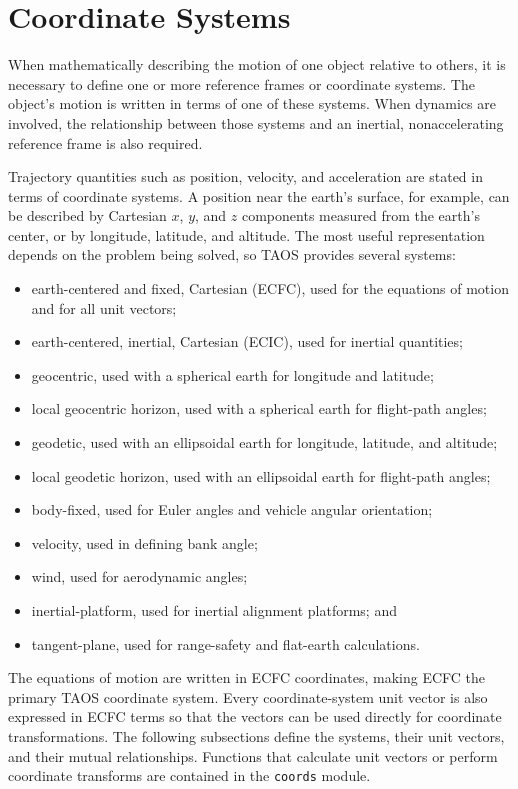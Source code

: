 \section{Coordinate Systems}\label{sec:coordinate-systems}

When mathematically describing the motion of one object relative to others, it is
necessary to define one or more reference frames or coordinate systems. The
object's motion is written in terms of one of these systems. When dynamics are
involved, the relationship between those systems and an inertial, nonaccelerating
reference frame is also required.

Trajectory quantities such as position, velocity, and acceleration are stated in
terms of coordinate systems. A position near the earth's surface, for example, can
be described by Cartesian $x$, $y$, and $z$ components measured from the earth's
center, or by longitude, latitude, and altitude. The most useful representation
depends on the problem being solved, so TAOS provides several systems:

\begin{itemize}[leftmargin=1.6em]
  \item earth-centered and fixed, Cartesian (ECFC), used for the equations of
    motion and for all unit vectors;
  \item earth-centered, inertial, Cartesian (ECIC), used for inertial quantities;
  \item geocentric, used with a spherical earth for longitude and latitude;
  \item local geocentric horizon, used with a spherical earth for flight-path angles;
  \item geodetic, used with an ellipsoidal earth for longitude, latitude, and altitude;
  \item local geodetic horizon, used with an ellipsoidal earth for flight-path angles;
  \item body-fixed, used for Euler angles and vehicle angular orientation;
  \item velocity, used in defining bank angle;
  \item wind, used for aerodynamic angles;
  \item inertial-platform, used for inertial alignment platforms; and
  \item tangent-plane, used for range-safety and flat-earth calculations.
\end{itemize}

The equations of motion are written in ECFC coordinates, making ECFC the primary
TAOS coordinate system. Every coordinate-system unit vector is also expressed in
ECFC terms so that the vectors can be used directly for coordinate transformations.
The following subsections define the systems, their unit vectors, and their mutual
relationships. Functions that calculate unit vectors or perform coordinate transforms
are contained in the \texttt{coords} module.
